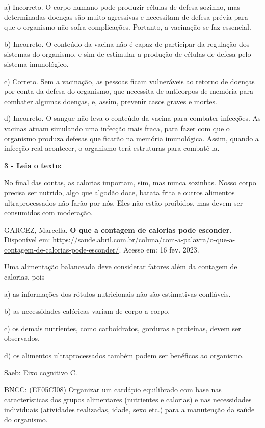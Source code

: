 a) Incorreto. O corpo humano pode produzir células de defesa sozinho,
mas determinadas doenças são muito agressivas e necessitam de defesa
prévia para que o organismo não sofra complicações. Portanto, a
vacinação se faz essencial.

b) Incorreto. O conteúdo da vacina não é capaz de participar da
regulação dos sistemas do organismo, e sim de estimular a produção de
células de defesa pelo sistema imunológico.

c) Correto. Sem a vacinação, as pessoas ficam vulneráveis ao retorno de
doenças por conta da defesa do organismo, que necessita de anticorpos de
memória para combater algumas doenças, e, assim, prevenir casos graves e
mortes.

d) Incorreto. O sangue não leva o conteúdo da vacina para combater
infecções. As vacinas atuam simulando uma infecção mais fraca, para
fazer com que o organismo produza defesas que ficarão na memória
imunológica. Assim, quando a infecção real acontecer, o organismo terá
estruturas para combatê-la.

\textbf{3 - Leia o texto:}

No final das contas, as calorias importam, sim, mas nunca sozinhas.
Nosso corpo precisa ser nutrido, algo que algodão doce, batata frita e
outros alimentos ultraprocessados não farão por nós. Eles não estão
proibidos, mas devem ser consumidos com moderação.

GARCEZ, Marcella. \textbf{O que a contagem de calorias pode esconder}.
Disponível em:
\url{https://saude.abril.com.br/coluna/com-a-palavra/o-que-a-contagem-de-calorias-pode-esconder/}.
Acesso em: 16 fev. 2023.

Uma alimentação balanceada deve considerar fatores além da contagem de
calorias, pois

a) as informações dos rótulos nutricionais não são estimativas
confiáveis.

b) as necessidades calóricas variam de corpo a corpo.

c) os demais nutrientes, como carboidratos, gorduras e proteínas, devem
ser observados.

d) os alimentos ultraprocessados também podem ser benéficos ao
organismo.

Saeb: Eixo cognitivo C.

BNCC: (EF05CI08) Organizar um cardápio equilibrado com base nas
características dos grupos alimentares (nutrientes e calorias) e nas
necessidades individuais (atividades realizadas, idade, sexo etc.) para
a manutenção da saúde do organismo.

